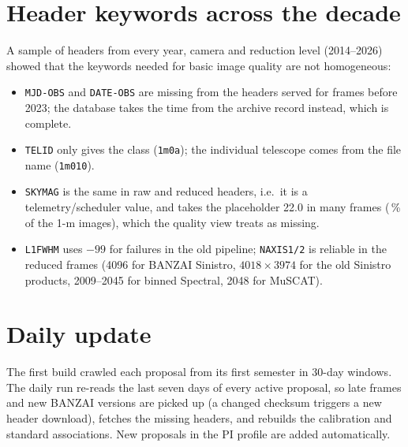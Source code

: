 \section{Header keywords across the decade}
A sample of headers from every year, camera and reduction level (2014--2026) showed that the keywords needed
for basic image quality are not homogeneous:
\begin{itemize}\setlength{\itemsep}{1pt}
\item \texttt{MJD-OBS} and \texttt{DATE-OBS} are missing from the headers served for frames before 2023; the
  database takes the time from the archive record instead, which is complete.
\item \texttt{TELID} only gives the class (\texttt{1m0a}); the individual telescope comes from the file name
  (\texttt{1m010}).
\item \texttt{SKYMAG} is the same in raw and reduced headers, i.e.\ it is a telemetry/scheduler value, and
  takes the placeholder 22.0 in many frames (\fracSkyPlaceholder\,\% of the 1-m images), which the quality view
  treats as missing.
\item \texttt{L1FWHM} uses $-99$ for failures in the old pipeline; \texttt{NAXIS1/2} is reliable in the
  reduced frames (4096 for BANZAI Sinistro, $4018\times3974$ for the old Sinistro products, 2009--2045 for
  binned Spectral, 2048 for MuSCAT).
\end{itemize}

\section{Daily update}
The first build crawled each proposal from its first semester in 30-day windows. The daily run re-reads the last
seven days of every active proposal, so late frames and new BANZAI versions are picked up (a changed checksum
triggers a new header download), fetches the missing headers, and rebuilds the calibration and standard
associations. New proposals in the PI profile are added automatically.

